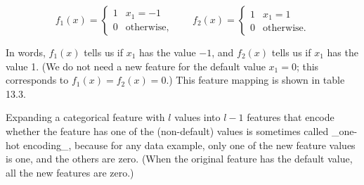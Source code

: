 \[f_{1}(x)=\left\{\begin{array}{rl}1&x_{1}=-1\\ 0&\text{otherwise,}\end{array}\right.\qquad f_{2}(x)=\left\{\begin{array}{rl}1 &x_{1}=1\\ 0&\text{otherwise.}\end{array}\right.\]

In words, \(f_{1}(x)\) tells us if \(x_{1}\) has the value \(-1\), and \(f_{2}(x)\) tells us if \(x_{1}\) has the value 1. (We do not need a new feature for the default value \(x_{1}=0\); this corresponds to \(f_{1}(x)=f_{2}(x)=0\).) This feature mapping is shown in table 13.3.

Expanding a categorical feature with \(l\) values into \(l-1\) features that encode whether the feature has one of the (non-default) values is sometimes called _one-hot encoding_, because for any data example, only one of the new feature values is one, and the others are zero. (When the original feature has the default value, all the new features are zero.) 
